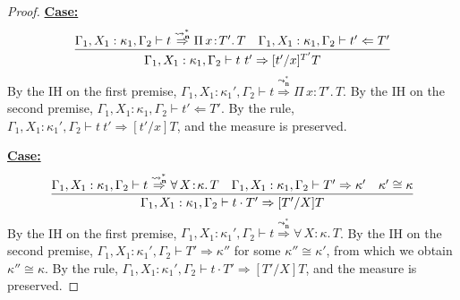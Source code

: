 \documentclass{article}
\newcommand{\abs}[4]{{#1}\, #2\! : \! #3.\, #4}
\newcommand{\leadstocs}[0]{\ensuremath{\leadsto_{\mathbf{n}}^*}}
\newcommand{\tpcheck}[0]{\Leftarrow}
\newcommand{\tpsynth}[0]{\Rightarrow}
\newcommand{\tpsynthleads}[0]{\ensuremath{\overset{\leadstocs}{\Rightarrow}}}
\newcommand{\startcase}[1]{\vspace{#1} \noindent\textbf{\underline{Case:}}}
\begin{document}
\begin{proof}
  \startcase{.2cm}
  \[
    \infer{
      \Gamma_1,X_1:\kappa_1,\Gamma_2 \vdash t\ t' \tpsynth [t'/x]^{T'}T
    }{
      \Gamma_1,X_1:\kappa_1,\Gamma_2 \vdash t \tpsynthleads \abs{\Pi}{x}{T'}{T}
      & \Gamma_1,X_1:\kappa_1,\Gamma_2\vdash t' \tpcheck T'
    }
  \]
  By the IH on the first premise, \(\Gamma_1,X_1:\kappa_1',\Gamma_2 \vdash t
  \tpsynthleads \abs{\Pi}{x}{T'}{T}\).
  By the IH on the second premise, \(\Gamma_1,X_1:\kappa_1,\Gamma_2 \vdash t'
  \tpcheck T'\).
  By the rule, \(\Gamma_1,X_1:\kappa_1',\Gamma_2 \vdash t\ t' \tpsynth [t'/x]T\),
  and the measure is preserved.
  
  \startcase{.2cm}
  \[
    \infer{
      \Gamma_1,X_1:\kappa_1,\Gamma_2 \vdash t \cdot T' \tpsynth [T'/X]T
    }{
      \Gamma_1,X_1:\kappa_1,\Gamma_2 \vdash t \tpsynthleads
      \abs{\forall}{X}{\kappa}{T}
      & \Gamma_1,X_1:\kappa_1,\Gamma_2 \vdash T' \tpsynth \kappa'
      & \kappa'\cong\kappa
    }
  \]
  By the IH on the first premise, \(\Gamma_1,X_1:\kappa_1',\Gamma_2 \vdash t
  \tpsynthleads \abs{\forall}{X}{\kappa}{T}\).
  By the IH on the second premise, \(\Gamma_1,X_1:\kappa_1',\Gamma_2 \vdash T'
  \tpsynth \kappa''\) for some \(\kappa'' \cong \kappa'\), from which we obtain
  \(\kappa'' \cong \kappa\).
  By the rule, \(\Gamma_1,X_1:\kappa_1',\Gamma_2 \vdash t \cdot T' \tpsynth
  [T'/X]T\), and the measure is preserved.
\end{proof}
\end{document}
